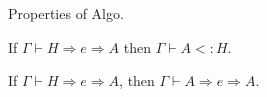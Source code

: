 \begin{frame}{Properties of Algo.}
\begin{lemma}
If $\Gamma \vdash H \Rightarrow e \Rightarrow A$ then $\Gamma \vdash A <: H$.
\end{lemma}

\begin{lemma}
If $\Gamma \vdash H \Rightarrow e \Rightarrow A$, then $\Gamma \vdash A \Rightarrow e \Rightarrow A$.
\end{lemma}
\end{frame}
